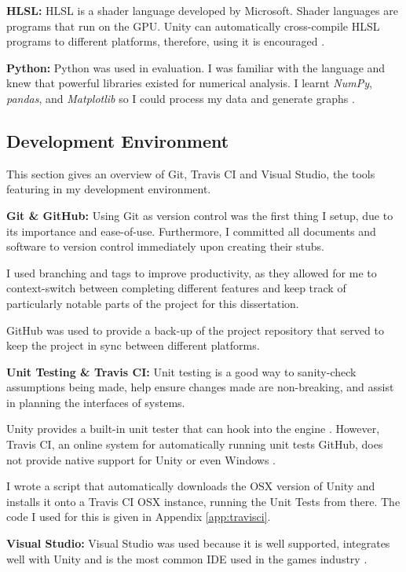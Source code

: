 \documentclass[12pt,a4paper,twoside]{report}
\begin{document}
\textbf{HLSL:} HLSL is a shader language developed by Microsoft. Shader
languages are programs that run on the GPU. Unity can automatically
cross-compile HLSL programs to different platforms, therefore, using it is
encouraged \cite{UnityShaders}.

\textbf{Python:} Python was used in evaluation. I was familiar with the
language and knew that powerful libraries existed for numerical analysis. I
learnt \textit{NumPy}, \textit{pandas}, and \textit{Matplotlib} so I could
process my data and generate graphs \cite{NumPy} \cite{pandas}
\cite{Matplotlib}.

\subsection{Development Environment}

This section gives an overview of Git, Travis CI and Visual Studio, the tools
featuring in my development environment.

\textbf{Git \& GitHub:} Using Git as version control was the first thing I
setup, due to its importance and ease-of-use. Furthermore, I committed all
documents and software to version control immediately upon creating their
stubs.

I used branching and tags to improve productivity, as they allowed for me to
context-switch between completing different features and keep track of
particularly notable parts of the project for this dissertation.

GitHub was used to provide a back-up of the project repository that served to
keep the project in sync between different platforms.

\textbf{Unit Testing \& Travis CI:} Unit testing is a good way to sanity-check
assumptions being made, help ensure changes made are non-breaking, and assist
in planning the interfaces of systems.

Unity provides a built-in unit tester that can hook into the engine
\cite{UnityEditorTestRunner}. However, Travis CI, an online system for
automatically running unit tests GitHub, does not provide native support for
Unity or even Windows \cite{TravisCILanguages} \cite{TravisCIOS}.

I wrote a script that automatically downloads the OSX version of Unity and
installs it onto a Travis CI OSX instance, running the Unit Tests from there.
The code I used for this is given in Appendix \ref{app:travisci}.

\textbf{Visual Studio:} Visual Studio was used because it is well supported,
integrates well with Unity and is the most common IDE used in the games
industry \cite{UnityVisualStudio} \cite{gameenginebook}.
\end{document}
